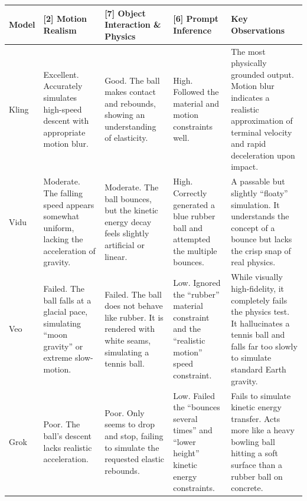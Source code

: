 \documentclass[sigconf]{acmart}
\begin{document}
\begin{table}[H]
    \centering
    \renewcommand{\arraystretch}{1.3}
    \begin{tabularx}{\textwidth}{| l | >{\raggedright\arraybackslash}X | >{\raggedright\arraybackslash}X | >{\raggedright\arraybackslash}X | >{\raggedright\arraybackslash}X |}
        \hline
        \textbf{Model} & \textbf{[2] Motion Realism}                                                                   & \textbf{[7] Object Interaction \& Physics}                                                               & \textbf{[6] Prompt Inference}                                                                  & \textbf{Key Observations}                                                                                                                                      \\ \hline
        Kling          & Excellent. Accurately simulates high-speed descent with appropriate motion blur.              & Good. The ball makes contact and rebounds, showing an understanding of elasticity.                       & High. Followed the material and motion constraints well.                                       & The most physically grounded output. Motion blur indicates a realistic approximation of terminal velocity and rapid deceleration upon impact.                  \\ \hline
        Vidu           & Moderate. The falling speed appears somewhat uniform, lacking the acceleration of gravity.    & Moderate. The ball bounces, but the kinetic energy decay feels slightly artificial or linear.            & High. Correctly generated a blue rubber ball and attempted the multiple bounces.               & A passable but slightly ``floaty'' simulation. It understands the concept of a bounce but lacks the crisp snap of real physics.                                \\ \hline
        Veo            & Failed. The ball falls at a glacial pace, simulating ``moon gravity'' or extreme slow-motion. & Failed. The ball does not behave like rubber. It is rendered with white seams, simulating a tennis ball. & Low. Ignored the ``rubber'' material constraint and the ``realistic motion'' speed constraint. & While visually high-fidelity, it completely fails the physics test. It hallucinates a tennis ball and falls far too slowly to simulate standard Earth gravity. \\ \hline
        Grok           & Poor. The ball's descent lacks realistic acceleration.                                        & Poor. Only seems to drop and stop, failing to simulate the requested elastic rebounds.                   & Low. Failed the ``bounces several times'' and ``lower height'' kinetic energy constraints.     & Fails to simulate kinetic energy transfer. Acts more like a heavy bowling ball hitting a soft surface than a rubber ball on concrete.                          \\ \hline

\end{tabularx}
\end{table}
\end{document}

